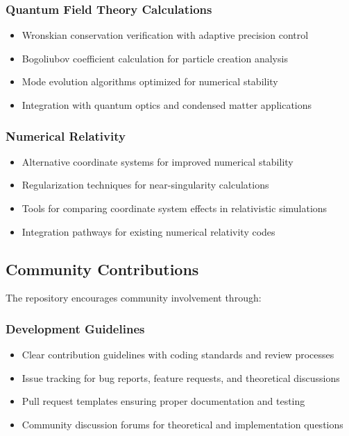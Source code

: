 \subsubsection{Quantum Field Theory Calculations}

\begin{itemize}
\item Wronskian conservation verification with adaptive precision control
\item Bogoliubov coefficient calculation for particle creation analysis  
\item Mode evolution algorithms optimized for numerical stability
\item Integration with quantum optics and condensed matter applications
\end{itemize}

\subsubsection{Numerical Relativity}

\begin{itemize}
\item Alternative coordinate systems for improved numerical stability
\item Regularization techniques for near-singularity calculations
\item Tools for comparing coordinate system effects in relativistic simulations
\item Integration pathways for existing numerical relativity codes
\end{itemize}

\subsection{Community Contributions}
\label{subsec:community_contributions}

The repository encourages community involvement through:

\subsubsection{Development Guidelines}

\begin{itemize}
\item Clear contribution guidelines with coding standards and review processes
\item Issue tracking for bug reports, feature requests, and theoretical discussions
\item Pull request templates ensuring proper documentation and testing
\item Community discussion forums for theoretical and implementation questions
\end{itemize}

